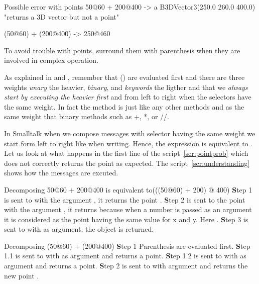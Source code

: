 \begin{scriptwithtitle}{Possible error with points}\label{scr:pointprob}
50@60 + 200@400
->  a B3DVector3(250.0 260.0 400.0)
"returns a 3D vector but not a point"

(50@60) + (200@400)
-> 250@460
\end{scriptwithtitle}

\begin{astuce}
To avoid trouble with points, surround them with parenthesis when they are involved in complex operation.
\end{astuce}

\begin{spicy}
As explained in\charef{} and \charef{}, remember that () are evaluated first and there are three weights {\em unary} the heavier, {\em binary}, and {\em keywords} the ligther and that we {\em always start by executing the heavier first} and from left to right when the selectors have the same weight.  In fact the method  is just like any other methods and as the same weight that binary methods such as +, *, or //. 

In Smalltalk when we compose messages with selector having the same weight we start form left to right like when writing. 
Hence, the expression  is equivalent to . Let us look at what happens in the first line of the script~\ref{scr:pointprob} which does not correctly returns the point  as expected. The script~\ref{scr:understanding} shows how the messages are excuted. 
\end{spicy}


\begin{scriptwithtitle}{Decomposing }\label{scr:understanding}
50@60 + 200@400 {\rmfamily is equivalent to}(((50@60) + 200) @ 400)
{\rmfamily
{\textbf Step 1}
    is sent to  with the argument , it returns the point . 
{\textbf Step 2}
   \ct{+} is sent to the point  with the argument , it returns
    because when a number is passed as an argument it is 
   considered as the point having the same value for x and y. 
   Here . 
{\textbf Step 3} 
    is sent to  with  as argument, the object
    is returned.}
\end{scriptwithtitle}


\begin{scriptwithtitle}{Decomposing }\label{scr:understanding2}
(50@60) + (200@400)
{\rmfamily
{\textbf Step 1} 
   Parenthesis are evaluated first.
{\textbf Step 1.1} 
   is sent to  with  as argument and returns a point.
{\textbf Step 1.2} 
   is sent to  with  as argument and returns a point.
{\textbf Step 2} 
   \ct{+} is sent to  with argument  and 
    returns the new point .}
\end{scriptwithtitle}



